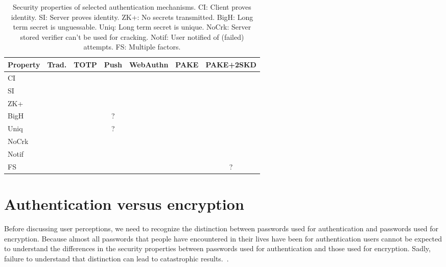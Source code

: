 \documentclass[12pt]{article}
\newcommand{\cmark}{\ding{51}}%
\newcommand{\xmark}{\ding{53}}%
\newcommand{\prop}[1]{\textsf{#1}}
\begin{document}
\begin{table}
  \begin{tabular}{lcccccc}
    \toprule
    \textbf{Property} & \textbf{Trad.}   & \textbf{TOTP}    & \textbf{Push}  & \textbf{WebAuthn}  & \textbf{PAKE}   & \textbf{PAKE+2SKD} \\
    \midrule
    \prop{CI}       & \cmark  & \cmark  & \cmark  & \cmark & \cmark  & \cmark \\
    \prop{SI}       & \xmark  & \xmark  & \xmark  & \cmark & \cmark  & \cmark \\
    \prop{ZK+}      & \xmark  & \cmark  & \cmark  & \cmark & \cmark  & \cmark \\
    \prop{BigH}     & \xmark  & \cmark  & ?       & \cmark & \xmark  & \cmark \\
    \prop{Uniq}     & \xmark  & \cmark  & ?       & \cmark & \xmark  & \cmark \\
    \prop{NoCrk}    & \xmark  & \xmark  & \xmark  & \cmark & \xmark  & \cmark \\
    \prop{Notif}    & \xmark  & \xmark  & \cmark  & \xmark & \xmark  & \xmark \\
    \prop{FS}       & \xmark  & \cmark  & \cmark  & \cmark & \xmark  & ?      \\
    \bottomrule
  \end{tabular}
  \caption[Security properties of selected authentication mechanisms]
      {Security properties of selected authentication mechanisms.
        \prop{CI}: Client proves identity.
        \prop{SI}: Server proves identity.
        \prop{ZK+}: No secrets transmitted.
        \prop{BigH}: Long term secret is unguessable.
        \prop{Uniq}: Long term secret is unique.
        \prop{NoCrk}: Server stored verifier can't be used for cracking.
        \prop{Notif}: User notified of (failed) attempts.
        \prop{FS}: Multiple factors.}\label{tab:props}
\end{table}

\section{Authentication versus encryption}

Before discussing user perceptions, we need to recognize the distinction between passwords used for authentication and passwords used for encryption.
Because almost all passwords that people have encountered in their lives have been for authentication users cannot be expected to understand the differences in the security properties between passwords used for authentication and those used for encryption.
Sadly, failure to understand that distinction can lead to catastrophic results.~\autocite{Blaze2011:cablegate}.
\end{document}
